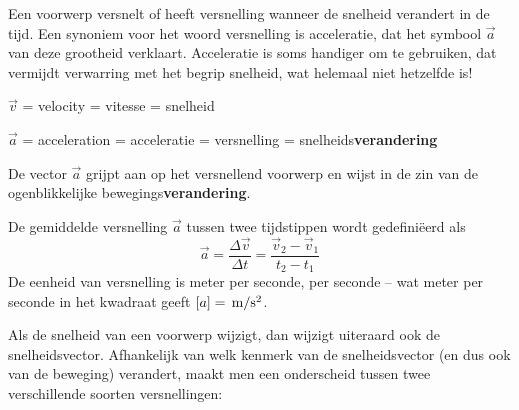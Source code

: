 \documentclass{ximera}
\begin{document}
	\author{Bart Lambregs, Vincent Gellens}
    \xmsource\xmuitleg

Een voorwerp versnelt of heeft versnelling wanneer de snelheid verandert in de tijd. Een synoniem voor het woord versnelling is acceleratie, dat het symbool \(\vec{a}\) van deze grootheid verklaart. 
Acceleratie is soms handiger om te gebruiken, dat vermijdt verwarring met het begrip snelheid, wat helemaal niet hetzelfde is!

\(\vec{v}\) = velocity = vitesse = snelheid

\(\vec{a}\) = acceleration = acceleratie = versnelling = snelheids\textbf{verandering}

De vector \(\vec{a}\) grijpt aan op het versnellend voorwerp en wijst in de zin van de ogenblikkelijke bewegings\textbf{verandering}.

\begin{definition}

De gemiddelde versnelling \(\vec{a}\) tussen twee tijdstippen wordt gedefiniëerd als
\[
\vec{a}=\frac{\Delta \vec{v}}{\Delta t}=\frac{\vec{v}_2-\vec{v}_1}{t_2-t_1}
\]
De eenheid van versnelling is meter per seconde, per seconde -- wat meter per seconde in het kwadraat geeft $[a]=\rm\,m/s^2$.

\end{definition}

Als de snelheid van een voorwerp wijzigt, dan wijzigt uiteraard ook de snelheidsvector. Afhankelijk van welk kenmerk van de snelheidsvector (en dus ook van de beweging) verandert, maakt men een onderscheid tussen twee verschillende soorten versnellingen:
\end{document}
